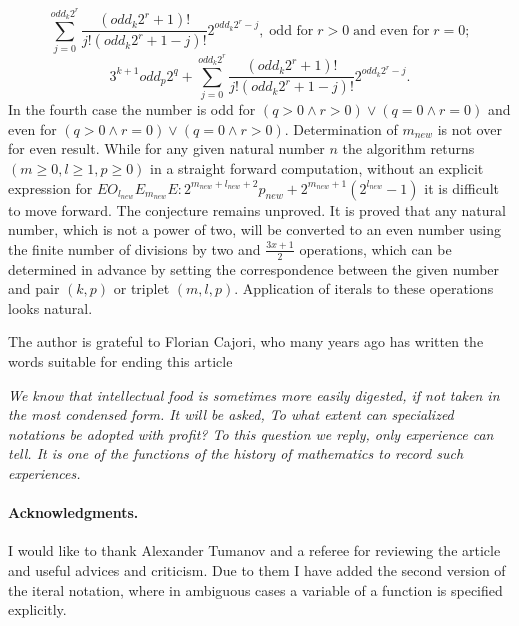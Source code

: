 \documentclass{article}
\begin{document}
\begin{displaymath}
\sum_{j=0}^{odd_k 2^r}\frac{(odd_k 2^r+1)!}{j!(odd_k 2^r+1-j)!}2^{odd_k 2^r-j}, \; \textrm{odd for} \; r > 0 \; \textrm{and even for} \; r = 0;
\end{displaymath}
\begin{displaymath}
3^{k+1}odd_p 2^{q} + \sum_{j=0}^{odd_k 2^r}\frac{(odd_k 2^r+1)!}{j!(odd_k 2^r+1-j)!}2^{odd_k 2^r-j}.
\end{displaymath}
In the fourth case the number is odd for $(q>0 \wedge r>0) \vee (q=0 \wedge r=0)$ and even for
$(q>0 \wedge r=0) \vee (q=0 \wedge r>0)$. Determination of $m_{new}$ is not over for even result. While for any given natural number $n$ the algorithm returns $(m \geq 0, l \geq 1, p \geq 0)$ in a straight forward computation, without an explicit expression for $EO_{l_{new}}{E_{m_{new}}}E : 2^{m_{new} + l_{new} + 2}p_{new} + 2^{m_{new}+1}(2^{l_{new}} -1)$ it is difficult to move forward. The conjecture remains unproved. It is proved that any natural number, which is not a power of two, will be converted to an even number using the finite number of divisions by two and $\frac{3x+1}{2}$ operations, which can be determined in advance by setting the correspondence between the given number and pair $(k, p)$ or triplet $(m, l, p)$. Application of iterals to these operations looks natural.

The author is grateful to Florian Cajori, who many years ago has written the words suitable for ending this article \cite[p. 77]{cajori}

\textit{We know that intellectual food is sometimes more easily digested, if not taken in the most condensed form. It will be asked, To what extent can specialized notations be adopted with profit? To this question we reply, only experience can tell. It is one of the functions of the history of mathematics to record such experiences.}

\paragraph{Acknowledgments.}  I would like to thank Alexander Tumanov and a referee for reviewing the article and useful advices and criticism. Due to them I have added the second version of the iteral notation, where in ambiguous cases a variable of a function is specified explicitly.
\end{document}
